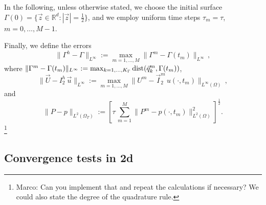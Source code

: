 \documentclass[a4paper,12pt,onecolumn]{article}
\newcommand{\R}{{\mathbb R}}
\newcommand{\errorXx}{\|\Gamma^h - \Gamma\|_{L^\infty}}
\newcommand{\errorUu}[1]{\|\vec U - I^h_{#1}\,\vec u\|_{L^\infty}}
\newcommand{\LerrorPp}{\|P - p\|_{L^2(\Omega_T)}}
\begin{document}
In the following, unless otherwise stated, we choose the initial surface 
$\Gamma(0) = \{ \vec z \in \R^d : |\vec z| = \frac12 \}$, and we employ 
uniform time steps $\tau_m=\tau$, $m=0,\ldots, M-1$.

Finally, we define the errors 
\begin{equation} \label{eq:errorXx}
\errorXx := \max_{m=1,\ldots, M} \|\Gamma^m - \Gamma(t_m)\|_{L^\infty}\,, 
\end{equation}
where $\|\Gamma^m - \Gamma(t_m)\|_{L^\infty} := 
\max_{k=1,\ldots, K_\Gamma} {\rm dist}( \vec{q}^m_k, \Gamma(t_m))$,
\begin{equation*} 
\errorUu2 := \max_{m=1,\ldots, M}\|U^m - \vec I^m_2\,u(\cdot,t_m)\|_{L^\infty(\Omega)}\,, 
\end{equation*}
and
\begin{equation*}
\LerrorPp := \left[\tau\,\sum_{m=1}^M \|P^m - p(\cdot,t_m)\|_{L^2(\Omega)}^2 
\right]^\frac12 .
\end{equation*}
\footnote{Marco: Can you implement that and repeat the calculations if necessary? We could also state the degree of the quadrature rule.}

\subsection{Convergence tests in 2d} \label{sec:41}
\end{document}
